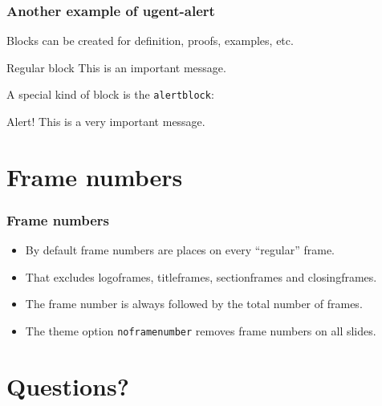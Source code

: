 \documentclass[aspectratio=169]{beamer}
\begin{document}
\begin{frame}
    \frametitle{Another example of ugent-alert}
    Blocks can be created for definition, proofs, examples, etc.
    \begin{block}{Regular block}
        This is an important message.
    \end{block}
    \vspace{.5cm}
    \pause
    A special kind of block is the \texttt{alertblock}:
    \begin{alertblock}{Alert!}
        This is a very important message.
    \end{alertblock}
\end{frame}


\section{Frame numbers}

\begin{frame}
    \frametitle{Frame numbers}
    \begin{itemize}
        \itemsep.25cm
        \item By default frame numbers are places on every ``regular'' frame.
        \item That excludes logoframes, titleframes, sectionframes and closingframes.
        \item The frame number is always followed by the total number of frames.
        \item The theme option \texttt{noframenumber} removes frame numbers on all slides.
    \end{itemize}
\end{frame}

\section{Questions?}

\titleframe
\end{document}
